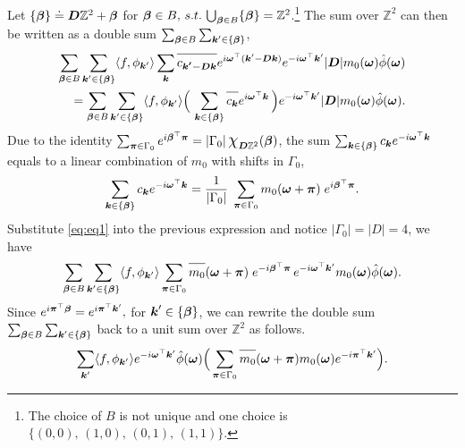 Let $\{\boldsymbol{\beta}\}\doteq \boldsymbol{D}\mathbb{Z}^2+\boldsymbol{\beta}$ for $\boldsymbol{\beta}\in B, \,s.t.\,\bigcup_{\boldsymbol{\beta}\in B} \{\boldsymbol{\beta}\} = \mathbb{Z}^2$.\footnote{The choice of $B$ is not unique and one choice is $ \{ (0,0),\,(1,0),\,(0,1),\,(1,1)\}$.}  The sum over $\mathbb{Z}^2$ can then be written as a double sum $\sum_{\boldsymbol{\beta}\in B}\sum_{\boldsymbol{k}'\in \{\boldsymbol{\beta}\}}$,
\begin{align*}
\sum_{\V{\beta}\in B}\sum_{\V{k}'\in\{\V{\beta}\}} \langle f,\phi_{\V{k}'}\rangle\sum_{\V{k}}\overlinespace{c_{\V{k'-Dk}}}e^{i\V{\omega}^\top(\V{k}'-\V{Dk})}e^{-i\V{\omega}^\top\V{k}'}|\V{D}|m_0(\V{\omega})\hat{\phi}(\V{\omega})\\
=\sum_{\V{\beta}\in B}\sum_{\V{k}'\in\{\V{\beta}\}} \langle f,\phi_{\V{k}'}\rangle\Big(\,\sum_{\V{k}\in\{\V{\beta}\}}\overlinespace{c_{\V{k}}}e^{i\V{\omega}^\top\V{k}}\,\Big)e^{-i\V{\omega}^\top\V{k}'}|\V{D}|m_0(\V{\omega})\hat{\phi}(\V{\omega}).
\end{align*}
Due to the identity $\sum_{\V{\pi}\in\Gamma_0}e^{i\V{\beta}^\top\V{\pi}} = |\Gamma_0| \, \scalebox{1.3}{$\chi$}_{\V{D}\mathbb{Z}^2}(\V{\beta})$, the sum $\sum_{\boldsymbol{k}\in \{\boldsymbol{\beta}\}}c_{\boldsymbol{k}}e^{-i\boldsymbol{\omega}^\top\boldsymbol{k}}$ equals to a linear combination of  $m_0$ with shifts in $\Gamma_0$,
\begin{align}\label{eq:eq1}
\sum_{\boldsymbol{k}\in \{\boldsymbol{\beta}\}}c_{\boldsymbol{k}}e^{-i\boldsymbol{\omega}^\top\boldsymbol{k}}
= \frac{1}{|\Gamma_0|}\;\sum_{\boldsymbol{\pi}\in\Gamma_0}m_0(\boldsymbol{\omega}+\boldsymbol{\pi})\;e^{i\boldsymbol{\beta}^\top\boldsymbol{\pi}} .
\end{align}
Substitute \eqref{eq:eq1} into the previous expression and notice $|\Gamma_0| = |D|=4$, we have
\begin{align*}
\sum_{\V{\beta}\in B}\sum_{\V{k}'\in \{\V{\beta}\}}\langle f,\phi_{\V{k}'}\rangle\sum_{\V{\pi}\in\Gamma_0}\overlinespace{m_0}(\V{\omega}+\V{\pi})\;e^{-i\V{\beta}^\top\V{\pi}}\,e^{-i\V{\omega}^\top\V{k}'}m_0(\V{\omega})\hat{\phi}(\V{\omega}).
\end{align*}
Since $e^{i \boldsymbol{\pi}^\top\boldsymbol{\beta}}=e^{i\boldsymbol{\pi}^\top\boldsymbol{k}'},$ for $\boldsymbol{k}'\in \{\boldsymbol{\beta}\} $, we can rewrite the double sum $\sum_{\boldsymbol{\beta}\in B}\sum_{\boldsymbol{k}'\in \{\boldsymbol{\beta}\}} $  back to a unit sum over $\mathbb{Z}^2$ as follows.
\begin{align*}
\sum_{\V{k}'}\langle f,\phi_{\V{k}'}\rangle e^{-i\V{\omega} ^\top\V{k}'}\hat{\phi}(\V{\omega})\Big(\sum_{\V{\pi}\in\Gamma_0}\overlinespace{m_0}(\V{\omega}+\V{\pi})m_0(\V{\omega})e^{-i\V{\pi}^\top\V{k}'} \Big).
\end{align*}

